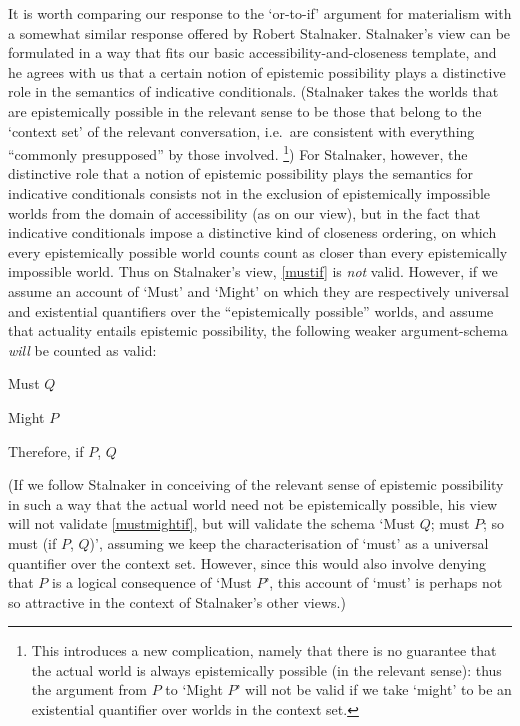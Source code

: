 \documentclass[If.tex]{subfiles}
\begin{document}
It is worth comparing our response to the ‘or-to-if’ argument for materialism with a somewhat similar response offered by Robert Stalnaker.  Stalnaker's view can be formulated in a way that fits our basic accessibility-and-closeness template, and he agrees with us that a certain notion of epistemic possibility plays a distinctive role in the semantics of indicative conditionals.  (Stalnaker takes the worlds that are epistemically possible in the relevant sense to be those that belong to the ‘context set’ of the relevant conversation, i.e.\ are consistent with everything “commonly presupposed” by those involved.%
\footnote{This introduces a new complication, namely that there is no guarantee that the actual world is always epistemically possible (in the relevant sense): thus the argument from $P$ to ‘Might $P$’ will not be valid if we take ‘might’ to be an existential quantifier over worlds in the context set.})
For Stalnaker, however, the distinctive role that a notion of epistemic possibility plays the semantics for indicative conditionals consists not in the exclusion of epistemically impossible worlds from the domain of accessibility (as on our view), but in the fact that indicative conditionals impose a distinctive kind of closeness ordering, on which every epistemically possible world counts count as closer than every epistemically impossible world.  Thus on Stalnaker's view, \ref{mustif} is \emph{not} valid.  However, if we assume an account of ‘Must’ and ‘Might’ on which they are respectively universal and existential quantifiers over the “epistemically possible” worlds, and assume that actuality entails epistemic possibility, the following weaker argument-schema \emph{will} be counted as valid:
\begin{prop}
	 \label{mustmightif}
	Must $Q$
	
	Might $P$
	
	Therefore, if $P$, $Q$
\end{prop}
(If we follow Stalnaker in conceiving of the relevant sense of epistemic possibility in such a way that the actual world need not be epistemically possible, his view will not validate \ref{mustmightif}, but will validate the schema ‘Must $Q$; must $P$; so must (if $P$, $Q$)’, assuming we keep the characterisation of ‘must’ as a universal quantifier over the context set.  However, since this would also involve denying that $P$ is a logical consequence of ‘Must $P$’, this account of ‘must’ is perhaps not so attractive in the context of Stalnaker's other views.)
\end{document}
